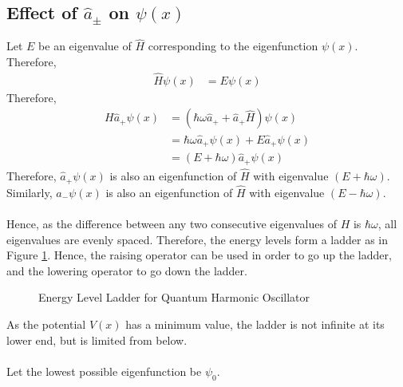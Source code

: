 \documentclass[titlepage, fleqn, a4paper, 12pt, twoside]{article}
\theoremstyle{definition}
\theoremstyle{theorem}
\let\Oldsubsection\subsection
\renewcommand{\subsection}{\FloatBarrier\Oldsubsection}
\begin{document}
\subsection{Effect of $\hat{a}_{\pm}$ on $\psi(x)$}

Let $E$ be an eigenvalue of $\hat{H}$ corresponding to the eigenfunction $\psi(x)$.\\
Therefore,
\begin{align*}
	\hat{H} \psi(x) &= E \psi(x)
\end{align*}
Therefore,
\begin{align*}
	H \hat{a}_+ \psi(x) &= \left( \hbar \omega \hat{a}_+ + \hat{a}_+ \hat{H} \right) \psi(x)\\
	&= \hbar \omega \hat{a}_+ \psi(x) + E \hat{a}_+ \psi(x)\\
	&= (E + \hbar \omega) \hat{a}_+ \psi(x)
\end{align*}
Therefore, $\hat{a}_+ \psi(x)$ is also an eigenfunction of $\hat{H}$ with eigenvalue $(E + \hbar \omega)$.\\
Similarly, $\hat{a}_- \psi(x)$ is also an eigenfunction of $\hat{H}$ with eigenvalue $(E - \hbar \omega)$.\\
~\\
Hence, as the difference between any two consecutive eigenvalues of $H$ is $\hbar \omega$, all eigenvalues are evenly spaced.
Therefore, the energy levels form a ladder as in Figure \ref{fig:Energy_Level_Ladder_for_Quantum_Harmonic_Oscillator}.
Hence, the raising operator can be used in order to go up the ladder, and the lowering operator to go down the ladder.
\begin{figure}[h]
	\centering
	\caption{Energy Level Ladder for Quantum Harmonic Oscillator}
	\label{fig:Energy_Level_Ladder_for_Quantum_Harmonic_Oscillator}
\end{figure}
As the potential $V(x)$ has a minimum value, the ladder is not infinite at its lower end, but is limited from below.\\
~\\
Let the lowest possible eigenfunction be $\psi_0$.
\end{document}
